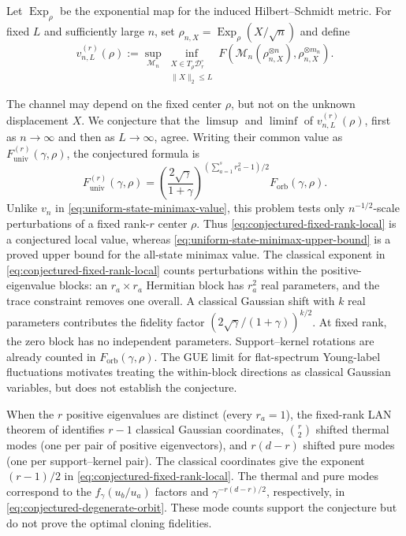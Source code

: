 \documentclass[11pt]{article}
\theoremstyle{remark}
\theoremstyle{plain}
\newcommand{\cM}{\mathcal M}
\newcommand{\ot}{\otimes}
\newcommand{\Forb}{F_{\mathrm{orb}}}
\newcommand{\Funiv}{F_{\mathrm{univ}}}
\begin{document}
Let \(\operatorname{Exp}_\rho\) be the exponential map for the induced
Hilbert--Schmidt metric.  For fixed \(L\) and sufficiently large \(n\), set
\(\rho_{n,X}=\operatorname{Exp}_\rho(X/\sqrt n)\) and define
\begin{equation}\label{eq:fixed-rank-local-minimax}
  v_{n,L}^{(r)}(\rho)
  :=\sup_{\cM_n}\inf_{\substack{X\in T_\rho\mathcal D_r^\circ\\
                                \|X\|_2\le L}}
  F\!\left(\cM_n(\rho_{n,X}^{\ot n}),\rho_{n,X}^{\ot m_n}\right).
\end{equation}

The channel may depend on the fixed center \(\rho\), but not on the
unknown displacement \(X\).  We conjecture that the \(\limsup\) and \(\liminf\) of
\(v_{n,L}^{(r)}(\rho)\), first as \(n\to\infty\) and then as
\(L\to\infty\), agree.  Writing their common value as
\(\Funiv^{(r)}(\gamma,\rho)\), the conjectured formula is
\begin{equation}\label{eq:conjectured-fixed-rank-local}
  \Funiv^{(r)}(\gamma,\rho)
  =\left(\frac{2\sqrt\gamma}{1+\gamma}\right)^{(\sum_{a=1}^s r_a^2-1)/2}
   \Forb(\gamma,\rho).
\end{equation}
Unlike \(v_n\) in \eqref{eq:uniform-state-minimax-value}, this problem
tests only \(n^{-1/2}\)-scale perturbations of a fixed rank-\(r\) center
\(\rho\).  Thus \eqref{eq:conjectured-fixed-rank-local} is a conjectured
local value, whereas \eqref{eq:uniform-state-minimax-upper-bound} is a
proved upper bound for the all-state minimax value.
The classical exponent in \eqref{eq:conjectured-fixed-rank-local} counts
perturbations within the positive-eigenvalue blocks: an
\(r_a\times r_a\) Hermitian block has \(r_a^2\) real parameters, and the
trace constraint removes one overall.  A classical Gaussian shift with
\(k\) real parameters contributes the fidelity factor
\((2\sqrt\gamma/(1+\gamma))^{k/2}\).  At fixed rank, the zero block has no
independent parameters. Support--kernel rotations are already counted in
\(\Forb(\gamma,\rho)\).  The GUE limit for flat-spectrum Young-label
fluctuations \cite{Kuperberg2002,Johansson2001} motivates treating the
within-block directions as classical Gaussian variables, but does not
establish the conjecture.

When the \(r\) positive eigenvalues are distinct (every \(r_a=1\)), the
fixed-rank LAN theorem of \cite[Theorem~3.3]{LahiryNussbaum2024}
identifies \(r-1\) classical Gaussian coordinates, \(\binom r2\) shifted
thermal modes (one per pair of positive eigenvectors), and \(r(d-r)\)
shifted pure modes (one per support--kernel pair).  The classical
coordinates give the exponent \((r-1)/2\) in
\eqref{eq:conjectured-fixed-rank-local}. The thermal and pure modes
correspond to the \(f_\gamma(u_b/u_a)\) factors and
\(\gamma^{-r(d-r)/2}\), respectively, in
\eqref{eq:conjectured-degenerate-orbit}.  These mode counts support the
conjecture but do not prove the optimal cloning fidelities.
\end{document}
